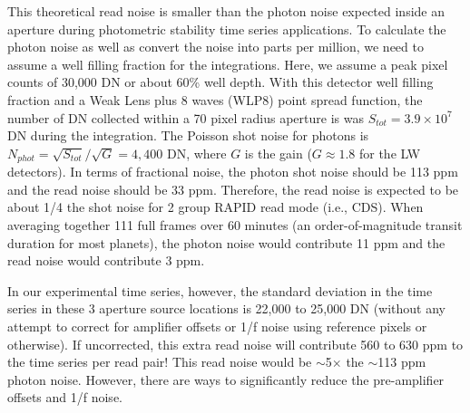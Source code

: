 \documentclass[]{aastex62}
\begin{document}
This theoretical read noise is smaller than the photon noise expected inside an aperture during photometric stability time series applications.
To calculate the photon noise as well as convert the noise into parts per million, we need to assume a well filling fraction for the integrations.
Here, we assume a peak pixel counts of 30,000 DN or about 60\% well depth.
With this detector well filling fraction and a Weak Lens plus 8 waves (WLP8) point spread function, the number of DN collected within a 70 pixel radius aperture is was $S_{tot}=3.9\times 10^7$ DN during the integration.
The Poisson shot noise for photons is $N_{phot} = \sqrt{S_{tot}} / \sqrt{G} = 4,400$ DN, where $G$ is the gain ($G \approx 1.8$ for the LW detectors).
In terms of fractional noise, the photon shot noise should be 113 ppm and the read noise should be 33 ppm.
Therefore, the read noise is expected to be about 1/4 the shot noise for 2 group RAPID read mode (i.e., CDS).
When averaging together 111 full frames over 60 minutes (an order-of-magnitude transit duration for most planets), the photon noise would contribute 11 ppm and the read noise would contribute 3 ppm.

In our experimental time series, however, the standard deviation in the time series in these 3 aperture source locations is 22,000 to 25,000 DN (without any attempt to correct for amplifier offsets or 1/f noise using reference pixels or otherwise).
If uncorrected, this extra read noise will contribute 560 to 630 ppm to the time series per read pair!
This read noise would be $\sim$5$\times$ the $\sim$113 ppm photon noise.
However, there are ways to significantly reduce the pre-amplifier offsets and 1/f noise.
\end{document}
